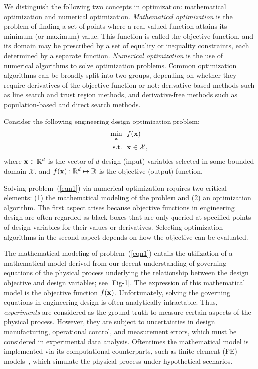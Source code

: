 \documentclass[journal ]{new-aiaa}
\begin{document}
	We distinguish the following two concepts in optimization: mathematical optimization and numerical optimization.
	\textit{Mathematical optimization} is the problem of finding a set of points where a real-valued function attains its minimum (or maximum) value.
	This function is called the objective function, and its domain may be prescribed by a set of equality or inequality constraints, each determined by a separate function.
	\textit{Numerical optimization} is the use of numerical algorithms to solve optimization problems.
	Common optimization algorithms can be broadly split into two groups, depending on whether they require derivatives of the objective function or not: derivative-based methods such as line search and trust region methods, and derivative-free methods such as population-based and direct search methods.
	
	Consider the following engineering design optimization problem:
	\begin{equation}\label{eqn1}
		\begin{aligned}
			\underset{\bf x}{\min} \ \ & f(\bf x)\\
			\textrm{s.t.} \ \ 
			& \bf x \in \mathcal{X}, 
		\end{aligned}
	\end{equation} 
	where ${\bf x} \in \mathbb{R}^d$ is the vector of $d$ design (input) variables selected in some bounded domain $\mathcal{X}$, and $f({\bf x}):\mathbb{R}^d \mapsto \mathbb{R}$ is the objective (output) function.
	
	Solving problem~(\ref{eqn1}) via numerical optimization requires two critical elements: (1) the mathematical modeling of the problem and (2) an optimization algorithm.
	The first aspect arises because objective functions in engineering design are often regarded as black boxes that are only queried at specified points of design variables for their values or derivatives.
	Selecting optimization algorithms in the second aspect depends on how the objective can be evaluated. 
	
	The mathematical modeling of problem~(\ref{eqn1}) entails the utilization of a mathematical model derived from our decent understanding of governing equations of the physical process underlying the relationship between the design objective and design variables; see \cref{Fig-1}.
	The expression of this mathematical model is the objective function $f(\bf x)$.
	Unfortunately, solving the governing equations in engineering design is often analytically intractable.
	Thus, \textit{experiments} are considered as the ground truth to measure certain aspects of the physical process.
	However, they are subject to uncertainties in design manufacturing, operational control, and measurement errors, which must be considered in experimental data analysis.
	Oftentimes the mathematical model is implemented via its computational counterparts, such as finite element (FE) models~\citep{Bathe2006}, which simulate the physical process under hypothetical scenarios.
	
\end{document}
